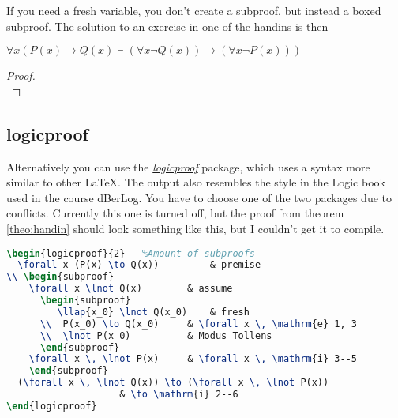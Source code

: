 \documentclass[a4, english]{article}
\begin{document}
If you need a fresh variable, you don't create a subproof, but instead a boxed subproof. The solution to an exercise in one of the handins is then
\begin{theorem} \label{theo:handin}
	$\forall x (P(x) \rightarrow Q(x) \vdash (\forall x \neg Q(x)) \rightarrow (\forall x \neg P(x)))$
\end{theorem}
\begin{proof}
	 \\
\end{proof}

\newpage
\subsection{logicproof}
Alternatively you can use the \href{http://mirrors.dotsrc.org/ctan/macros/latex/contrib/logicproof/logicproof.pdf}{\emph{logicproof}} package, which uses a syntax more similar to other \LaTeX. The output also resembles the style in the Logic book used in the course dBerLog. \cite{berlog}
You have to choose one of the two packages due to conflicts. Currently this one is turned off, but the proof from theorem \ref{theo:handin} should look something like this, but I couldn't get it to compile.

\begin{lstlisting}[language = tex]
\begin{logicproof}{2}	%Amount of subproofs
  \forall x (P(x) \to Q(x)) 		& premise
\\ \begin{subproof}
    \forall x \lnot Q(x)		& assume
      \begin{subproof}
         \llap{x_0} \lnot Q(x_0)	& fresh
      \\  P(x_0) \to Q(x_0)		& \forall x \, \mathrm{e} 1, 3
      \\  \lnot P(x_0)			& Modus Tollens
      \end{subproof}
    \forall x \, \lnot P(x)		& \forall x \, \mathrm{i} 3--5
    \end{subproof}
  (\forall x \, \lnot Q(x)) \to (\forall x \, \lnot P(x))
					& \to \mathrm{i} 2--6
\end{logicproof}
\end{lstlisting}
\end{document}

